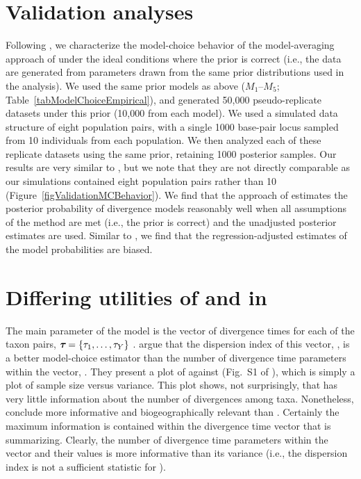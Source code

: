 \section*{Validation analyses}
Following \citet{Oaks2012}, we characterize the model-choice behavior of the
model-averaging approach of \citet{Hickerson2013} under the ideal conditions
where the prior is correct (i.e., the data are generated from parameters drawn
from the same prior distributions used in the analysis).
We used the same prior models as above ($M_1$--$M_5$;
Table~\ref{tabModelChoiceEmpirical}), and generated 50,000 pseudo-replicate
datasets under this prior (10,000 from each model).
We used a simulated data structure of eight population pairs, with a single
1000 base-pair locus sampled from 10 individuals from each population.
We then analyzed each of these replicate datasets using the same prior,
retaining 1000 posterior samples.
Our results are very similar to \citet{Oaks2012}, but we note that they
are not directly comparable as our simulations contained eight population
pairs rather than 10 (Figure~\ref{figValidationMCBehavior}).
We find that the approach of \citet{Hickerson2013} estimates the posterior
probability of divergence models reasonably well when all assumptions of the
method are met (i.e., the prior is correct) and the unadjusted posterior
estimates are used.
Similar to \cite{Oaks2012}, we find that the regression-adjusted estimates of
the model probabilities are biased.


\section*{Differing utilities of \numt{} and \vmratio{} in \msb}
The main parameter of the \msb model is the vector of divergence
times for each of the taxon pairs,
$\boldsymbol{\tau_{}} = \{\tau_{1}, \ldots, \tau_{Y}\}$
\citep{Oaks2012}.
\citet{Hickerson2013} argue that the dispersion index of this vector,
\vmratio{}, is a better model-choice estimator than the number of 
divergence time parameters within the vector,
\numt{}.
They present a plot of \numt{} against \vmratio{} (Fig.~S1 of
\citet{Hickerson2013}), which is simply a plot of sample size versus variance.
This plot shows, not surprisingly, that \vmratio{} has very little information
about the number of divergences among taxa.
Nonetheless, \citet{Hickerson2013} conclude \vmratio{} more informative and
biogeographically relevant than \numt{}.
Certainly the maximum information is contained within the divergence time
vector that \vmratio{} is summarizing.
Clearly, the number of divergence time parameters within the vector and their
values is more informative than its variance (i.e., the dispersion index is not
a sufficient statistic for \divtvector).

